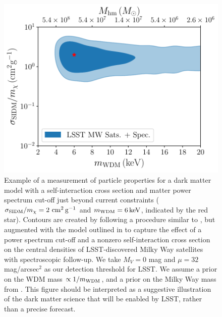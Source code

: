 \begin{figure}
\centering
\includegraphics[width=0.75\columnwidth]{figures/WDM_SIDM_discovery_test.pdf}
\caption{\label{fig:sidm_wdm_disc} Example of a measurement of particle properties for a dark matter model with a self-interaction cross section and matter power spectrum cut-off just beyond current constraints ($\sigma_{\rm SIDM}/m_\chi = 2 \mathrm{\,\mathrm{\,cm}^2\mathrm{\,g}^{-1}}$ and $m_{\rm WDM} = 6\mathrm{\,keV}$, indicated by the red star). Contours are created by following a procedure similar to \citet{Nadler:2018}, but augmented with the model outlined in  to capture the effect of a power spectrum cut-off and a nonzero self-interaction cross section on the central densities of LSST-discovered Milky Way satellites with spectroscopic follow-up. We take $M_V=0$ mag and $\mu=32$ mag/arcsec$^2$ as our detection threshold for LSST. We assume a prior on the WDM mass $\propto 1/m_{\rm WDM}$, and a prior on the Milky Way mass from \citet{Callingham:2018vcf}. This figure should be interpreted as a suggestive illustration of the dark matter science that will be enabled by LSST, rather than a precise forecast.  
}
\end{figure}

\vspace{1em} 

